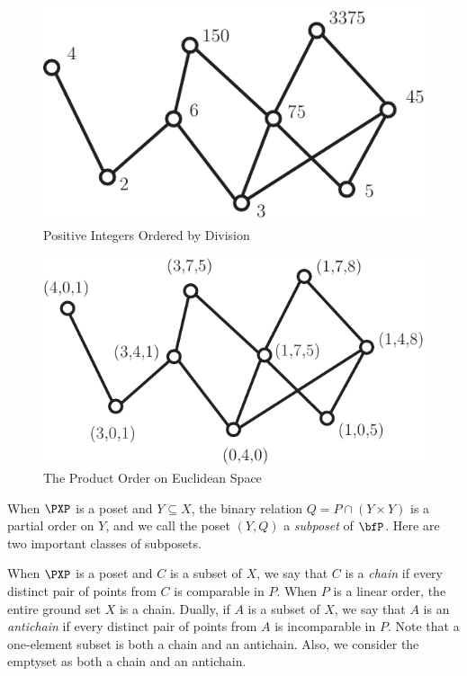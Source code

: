 \begin{figure}
\begin{center}
\includegraphics*[scale=.4]{posets-figs/wttfig-3}
\caption{Positive Integers Ordered by Division}
\label{fig:division}
\end{center}
\end{figure}

\begin{figure}
\begin{center}
\includegraphics*[scale=.4]{posets-figs/wttfig-4}
\caption{The Product Order on Euclidean Space}
\label{fig:prod-euclid}
\end{center}
\end{figure}

When $\PXP$ is a poset and $Y\subseteq X$, the binary relation
$Q=P\cap(Y\times Y)$ is a partial order on $Y$, and we call the
poset $(Y,Q)$ a \textit{subposet} of $\bfP$.  Here are two
important classes of subposets.

When $\PXP$ is a poset and $C$ is a subset of $X$,
we say that $C$ is a \textit{chain} if every distinct pair of points 
from $C$ is comparable in $P$.  When $P$ is a linear order, the entire ground 
set $X$ is a chain.  Dually, if $A$ is a subset of $X$, we say that
$A$ is an \textit{antichain} if every distinct pair of points from $A$ 
is incomparable in $P$.  Note that a one-element subset
is both a chain and an antichain.  Also, we consider the emptyset as
both a chain and an antichain.

